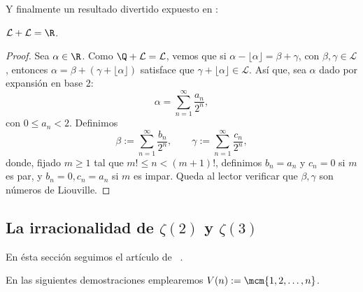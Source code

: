 \documentclass[teoria-numeros.tex]{subfiles}
\begin{document}
Y finalmente un resultado divertido expuesto en \cite{erdos62liouville}:
\begin{thm}[Erd\H os]
	$\mathcal{L + L} = \R$.
\end{thm}
\begin{proof}
	Sea $\alpha \in \R$.
	Como $\Q + \mathcal{L} = \mathcal{L}$, vemos que si $\alpha - \lfloor \alpha \rfloor = \beta + \gamma$, con $\beta, \gamma \in \mathcal{L}$,
	entonces $\alpha = \beta + (\gamma + \lfloor \alpha \rfloor)$ satisface que $\gamma + \lfloor \alpha \rfloor \in \mathcal{L}$.
	Así que, sea $\alpha$ dado por expansión en base 2:
	$$ \alpha = \sum_{n=1}^{\infty} \frac{a_n}{2^n}, $$
	con $0 \le a_n < 2$.
	Definimos
	$$ \beta := \sum_{n=1}^{\infty} \frac{b_n}{2^n}, \qquad \gamma := \sum_{n=1}^{\infty} \frac{c_n}{2^n}, $$
	donde, fijado $m \ge 1$ tal que $m! \le n < (m+1)!$, definimos $b_n = a_n$ y $c_n = 0$ si $m$ es par,
	y $b_n = 0, c_n = a_n$ si $m$ es impar.
	Queda al lector verificar que $\beta, \gamma$ son números de Liouville.
\end{proof}
\nocite{hlawka:number, hua:number, granville:masterclass}

\subsection{La irracionalidad de $\zeta(2)$ y $\zeta(3)$}
En ésta sección seguimos el artículo de \citeauthor{beukers79irrationality}~\cite{beukers79irrationality}.

En las siguientes demostraciones emplearemos $V(n) := \mcm\{ 1, 2, \dots, n \}$.
\end{document}
